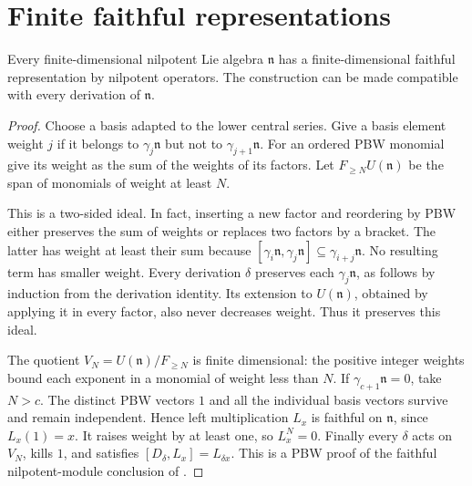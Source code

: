 \section{Finite faithful representations}

\begin{proposition}\label{res:I08}
Every finite-dimensional nilpotent Lie algebra \(\mathfrak n\)
has a finite-dimensional faithful representation by nilpotent
operators. The construction can be made compatible with every
derivation of \(\mathfrak n\).
\end{proposition}
\begin{proof}
Choose a basis adapted to the lower central series. Give a basis
element weight \(j\) if it belongs to
\(\gamma_j\mathfrak n\) but not to \(\gamma_{j+1}\mathfrak n\).
For an ordered PBW monomial give its weight as the sum of the
weights of its factors. Let \(F_{\geq N}U(\mathfrak n)\) be the span
of monomials of weight at least \(N\).

This is a two-sided ideal. In fact, inserting a new factor and
reordering by PBW either preserves the sum of weights or replaces
two factors by a bracket. The latter has weight at least their
sum because
\([\gamma_i\mathfrak n,\gamma_j\mathfrak n]\subseteq
\gamma_{i+j}\mathfrak n\). No resulting term has smaller weight.
Every derivation \(\delta\) preserves each \(\gamma_j\mathfrak n\),
as follows by induction from the derivation identity. Its extension
to \(U(\mathfrak n)\), obtained by applying it in every factor, also
never decreases weight. Thus it preserves this ideal.

The quotient \(V_N=U(\mathfrak n)/F_{\geq N}\) is finite dimensional:
the positive integer weights bound each exponent in a monomial of
weight less than \(N\). If \(\gamma_{c+1}\mathfrak n=0\), take
\(N>c\). The distinct PBW vectors \(1\) and all the individual
basis vectors survive and remain independent. Hence left
multiplication \(L_x\) is faithful on \(\mathfrak n\), since
\(L_x(1)=x\). It raises weight by at least one, so \(L_x^N=0\).
Finally every \(\delta\) acts on \(V_N\), kills \(1\), and satisfies
\([D_\delta,L_x]=L_{\delta x}\).
This is a PBW proof of the faithful nilpotent-module conclusion
of \cite[Proposition 50.5 and Corollary 50.7]{etingof}.
\end{proof}

